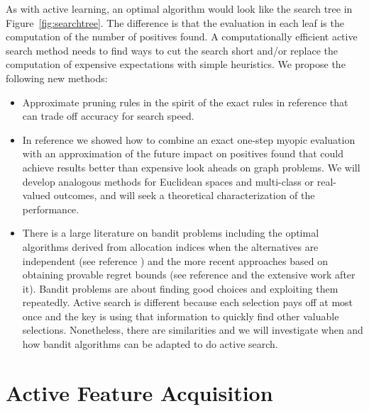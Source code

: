 \documentclass[prd,nofootbib,floatfix,11pt,tightenlines,nofootinbib]{revtex4}
\begin{document}
As with active learning, an optimal algorithm would look like the search
tree in Figure~\ref{fig:searchtree}.  The difference is that the evaluation
in each leaf is the computation of the number of positives found.  A
computationally efficient active search method needs to find ways to cut
the search short and/or replace the computation of expensive expectations
with simple heuristics.  We propose the following new methods:
\vspace{.5\baselineskip}
\begin{itemize}
\item Approximate pruning rules in the spirit of the exact rules in reference
  \cite{Garnett12} that can trade off accuracy for search speed.

\item In reference \cite{Wang13} we showed how to combine an exact one-step myopic
  evaluation with an approximation of the future impact on positives found
  that could achieve results better than expensive look aheads on graph problems.
  We will develop analogous methods for Euclidean spaces and multi-class or
  real-valued outcomes, and will seek a theoretical characterization of the
  performance.

\item There is a large literature on bandit problems including the optimal
  algorithms derived from allocation indices when the alternatives are
  independent (see reference \cite{Gittin89}) and the more recent approaches based on
  obtaining provable regret bounds (see reference \cite{Auer02} and the extensive
  work after it).  Bandit problems are about finding good choices and
  exploiting them repeatedly.  Active search is different because each
  selection pays off at most once and the key is using that information to
  quickly find other valuable selections.  Nonetheless, there are
  similarities and we will investigate when and how bandit algorithms can
  be adapted to do active search.

\end{itemize}
\vspace{.5\baselineskip}

\section{Active Feature Acquisition}
\end{document}
